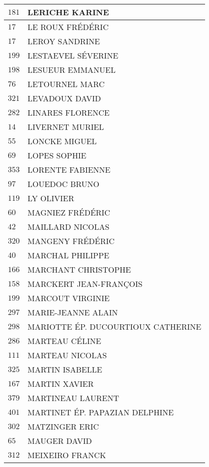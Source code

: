 \begin{xltabular}{\linewidth}{|l|X|}
    \hline
    $181$ & LERICHE KARINE \\
    \hline
    $17$ & LE ROUX FRÉDÉRIC \\
    \hline
    $17$ & LEROY SANDRINE \\
    \hline
    $199$ & LESTAEVEL SÉVERINE \\
    \hline
    $198$ & LESUEUR EMMANUEL \\
    \hline
    $76$ & LETOURNEL MARC \\
    \hline
    $321$ & LEVADOUX DAVID \\
    \hline
    $282$ & LINARES FLORENCE \\
    \hline
    $14$ & LIVERNET MURIEL \\
    \hline
    $55$ & LONCKE MIGUEL \\
    \hline
    $69$ & LOPES SOPHIE \\
    \hline
    $353$ & LORENTE FABIENNE \\
    \hline
    $97$ & LOUEDOC BRUNO \\
    \hline
    $119$ & LY OLIVIER \\
    \hline
    $60$ & MAGNIEZ FRÉDÉRIC \\
    \hline
    $42$ & MAILLARD NICOLAS \\
    \hline
    $320$ & MANGENY FRÉDÉRIC \\
    \hline
    $40$ & MARCHAL PHILIPPE \\
    \hline
    $166$ & MARCHANT CHRISTOPHE \\
    \hline
    $158$ & MARCKERT JEAN-FRANÇOIS \\
    \hline
    $199$ & MARCOUT VIRGINIE \\
    \hline
    $297$ & MARIE-JEANNE ALAIN \\
    \hline
    $298$ & MARIOTTE ÉP. DUCOURTIOUX CATHERINE \\
    \hline
    $286$ & MARTEAU CÉLINE \\
    \hline
    $111$ & MARTEAU NICOLAS \\
    \hline
    $325$ & MARTIN ISABELLE \\
    \hline
    $167$ & MARTIN XAVIER \\
    \hline
    $379$ & MARTINEAU LAURENT \\
    \hline
    $401$ & MARTINET ÉP. PAPAZIAN DELPHINE \\
    \hline
    $302$ & MATZINGER ERIC \\
    \hline
    $65$ & MAUGER DAVID \\
    \hline
    $312$ & MEIXEIRO FRANCK \\

\end{xltabular}
